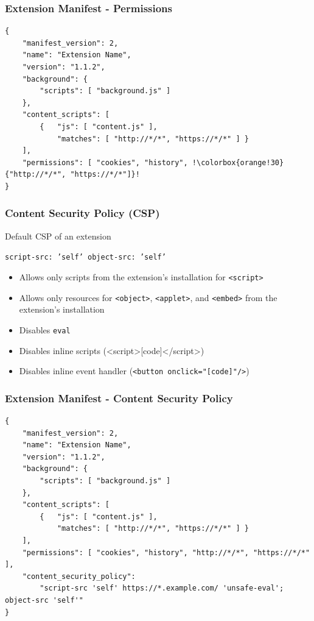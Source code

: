 \documentclass[accentcolor=tud9c,colorbacktitle,xcolor=dvipsnames]{tudbeamer}
\newcommand{\highlight}[4]{%
	\ifnum\value{lstnumber}=#1\color{orange!30}\fi%
	\ifnum\value{lstnumber}=#2\color{orange!30}\fi%
	\ifnum\value{lstnumber}=#3\color{orange!30}\fi%
	\ifnum\value{lstnumber}=#4\color{orange!30}\fi%
}
\begin{document}
\begin{frame}[fragile]
	\frametitle{Extension Manifest - Permissions}
	\begin{lstlisting}
{
	"manifest_version": 2,
	"name": "Extension Name",
	"version": "1.1.2",
	"background": {
		"scripts": [ "background.js" ]
	},
	"content_scripts": [
		{ 	"js": [ "content.js" ],
			"matches": [ "http://*/*", "https://*/*" ] }
	],
	"permissions": [ "cookies", "history", !\colorbox{orange!30}{"http://*/*", "https://*/*"]}!
}
\end{lstlisting}
\end{frame}

\begin{frame}
    \frametitle{Content Security Policy (CSP)}
    \begin{block}{Default CSP of an extension}
        \begin{center}
            \texttt{script-src: 'self' object-src: 'self'}
        \end{center}
         \begin{itemize}
            \item Allows only scripts from the extension's installation for \texttt{<script>}
            \item Allows only resources for \texttt{<object>}, \texttt{<applet>}, and \texttt{<embed>} from the extension's installation
            \item Disables \texttt{eval}
            \item Disables inline scripts (<script>[code]</script>)
            \item Disables inline event handler (\texttt{<button onclick="[code]"/>})
        \end{itemize}
    \end{block}
\end{frame}

\begin{frame}[fragile]
	\frametitle{Extension Manifest - Content Security Policy}
	\begin{lstlisting}[linebackgroundcolor={\highlight{13}{14}{0}{0}}]
{
	"manifest_version": 2,
	"name": "Extension Name",
	"version": "1.1.2",
	"background": {
		"scripts": [ "background.js" ]
	},
	"content_scripts": [
		{ 	"js": [ "content.js" ],
			"matches": [ "http://*/*", "https://*/*" ] }
	],
	"permissions": [ "cookies", "history", "http://*/*", "https://*/*" ],
	"content_security_policy": 
		"script-src 'self' https://*.example.com/ 'unsafe-eval'; object-src 'self'"	
}
\end{lstlisting}
\end{frame}
\end{document}
